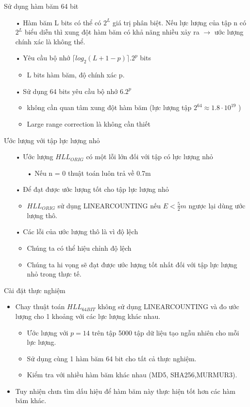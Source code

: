 \documentclass{beamer}
\newcommand{\bi}{\begin{itemize}}
\newcommand{\ei}{\end{itemize}}
\begin{document}
\begin{frame}{Sử dụng hàm băm 64 bit}
\begin{itemize}
\item[•] Hàm băm L bits có thể có $2^L$ giá trị phân biệt. Nếu lực lượng của tập n có $2^L$ biểu diễn thì xung đột hàm băm có khả năng nhiều xảy ra $\rightarrow$ ước lượng chính xác là không thể.
\item[•] Yêu cầu bộ nhớ $\lceil log_2(L + 1 - p) \rceil .2^p$ bits
\begin{itemize}
\item L bits hàm băm, độ chính xác p.
\end{itemize}
\item[•] Sử dụng 64 bits yêu cầu bộ nhớ $6.2^p$
\begin{itemize}
\item không cần quan tâm xung đột hàm băm (lực lượng tập $2^64 \approx 1.8\cdot 10^{19}$ )
\item Large range correction là không cần thiết 
\end{itemize}
\end{itemize}
\end{frame}
\begin{frame}{Ước lượng với tập lực lượng nhỏ}
\begin{itemize}
\item[•] Ước lượng $HLL_{ORIG}$ có một lỗi lớn đối với tập có lực lượng nhỏ
\begin{itemize}
\item[•] Nếu n = 0 thuật toán luôn trả về 0.7m 
\end{itemize}
\item[•] Để đạt được ước lượng tốt cho tập lực lượng nhỏ
\begin{itemize}
\item $HLL_{ORIG}$ sử dụng LINEARCOUNTING nếu $E < \frac{5}{2}m$ ngược lại dùng ước lượng thô. 
\end{itemize}
\item[•] Các lỗi của ước lượng thô là vì độ lệch
\begin{itemize}
\item Chúng ta có thể hiệu chỉnh độ lệch
\item Chúng ta hi vọng sẽ đạt được ước lượng tốt nhất đối với tập lực lượng nhỏ trong thực tế.
\end{itemize}
\end{itemize}
\end{frame}
\begin{frame}{Cài đặt thực nghiệm}
\bi
\item Chay thuật toán $HLL_{64BIT}$ không sử dụng LINEARCOUNTING và đo ước lượng cho 1 khoảng với các lực lượng khác nhau.
\bi
\item Ước lượng với $p = 14$ trên tập 5000 tập dữ liệu tạo ngẫu nhiên cho mỗi lực lượng.
\item Sử dụng cùng 1 hàm băm 64 bit cho tất cả thực nghiệm.
\item Kiểm tra với nhiều hàm băm khác nhau (MD5, SHA256,MURMUR3).
\ei
\item Tuy nhiện chưa tìm dấu hiệu để hàm băm này thực hiện tốt hơn các hàm băm khác.
\ei
\end{frame}
\end{document}
